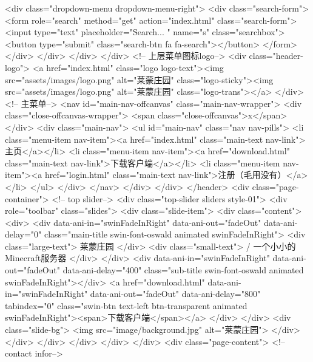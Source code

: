          <div class="dropdown-menu dropdown-menu-right"> 
          <div class="search-form"> 
           <form role="search" method="get" action="index.html" class="search-form"> 
            <input type="text" placeholder="Search... " name="s" class="searchbox"> 
            <button type="submit" class="search-btn fa fa-search"></button> 
           </form> 
          </div> 
         </div> 
        </div> 
       </div> 
       <!-- 上层菜单图标logo--> 
       <div class="header-logo">
        <a href="index.html" class="logo logo-text"><img src="assets/images/logo.png" alt="莱蒙庄园" class="logo-sticky"><img src="assets/images/logo.png" alt="莱蒙庄园" class="logo-trans"></a>
       </div> 
       <!-- 主菜单--> 
       <nav id="main-nav-offcanvas" class="main-nav-wrapper"> 
        <div class="close-offcanvas-wrapper">
         <span class="close-offcanvas">x</span>
        </div> 
        <div class="main-nav"> 
         <ul id="main-nav" class="nav nav-pills"> 
          <li class="menu-item nav-item"><a href="index.html" class="main-text nav-link">主页</a></li> 
          <li class="menu-item nav-item"><a href="download.html" class="main-text nav-link">下载客户端</a></li> 
          <li class="menu-item nav-item"><a href="login.html" class="main-text nav-link">注册（毛用没有）</a></li> 
         </ul> 
        </div> 
       </nav> 
      </div> 
     </div> 
    </header> 
    <div class="page-container"> 
     <!-- top slider--> 
     <div class="top-slider sliders style-01"> 
      <div role="toolbar" class="slides"> 
       <div class="slide-item"> 
        <div class="content"> 
         <div> 
          <div data-ani-in="swinFadeInRight" data-ani-out="fadeOut" data-ani-delay="0" class="main-title swin-font-oswald animated swinFadeInRight"> 
           <div class="large-text">
            莱蒙庄园
           </div> 
           <div class="small-text">
            / 一个小小的Minecraft服务器
           </div> 
          </div> 
          <div data-ani-in="swinFadeInRight" data-ani-out="fadeOut" data-ani-delay="400" class="sub-title swin-font-oswald animated swinFadeInRight"></div>
          <a href="download.html" data-ani-in="swinFadeInRight" data-ani-out="fadeOut" data-ani-delay="800" tabindex="0" class="swin-btn text-left btn-transparent animated swinFadeInRight"><span>下载客户端</span></a> 
         </div> 
        </div> 
        <div class="slide-bg">
         <img src="image/background.jpg" alt="莱蒙庄园">
        </div> 
       </div> 
      </div> 
     </div> 
    </div> 
   </div> 
   <div class="page-content"> 
    <!-- contact infor--> 
